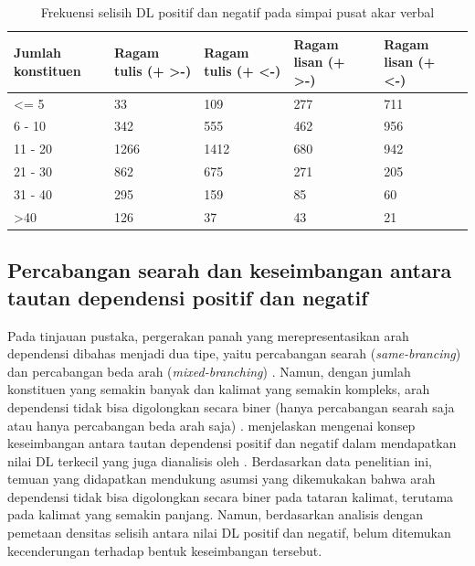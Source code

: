 
\begin{table}
\begin{center}
\begin{small}
\caption{Frekuensi selisih DL positif dan negatif pada simpai pusat akar verbal}  \label{tab:DLpusatposneg}
\begin{tabular}{ | p{2cm} | p{2cm} | p{2cm} | p{2cm} | p{2cm} |}
    \hline
Jumlah konstituen & Ragam tulis (+ \textgreater -) & Ragam tulis (+ \textless -) & Ragam lisan (+ \textgreater -) & Ragam lisan (+ \textless -) \\ \hline
\textless= 5 & 33 & 109 & 277 & 711 \\ \hline
6 - 10 & 342 & 555 & 462 & 956 \\ \hline
11 - 20 & 1266 & 1412 & 680 & 942 \\ \hline
21 - 30 & 862 & 675 & 271 & 205 \\ \hline
31 - 40 & 295 & 159 & 85 & 60 \\ \hline
\textgreater 40 & 126 & 37 & 43 & 21 \\ \hline
   \end{tabular}
   \end{small}
\end{center}
\end{table}


\subsection{Percabangan searah dan keseimbangan antara tautan dependensi positif dan negatif}
Pada tinjauan pustaka, pergerakan panah yang merepresentasikan arah dependensi dibahas menjadi dua tipe, yaitu percabangan searah (\textit{same-brancing}) dan percabangan beda arah (\textit{mixed-branching}) \citep{hawkins1994performance}. Namun, dengan jumlah konstituen yang semakin banyak dan kalimat yang semakin kompleks, arah dependensi tidak bisa digolongkan secara biner (hanya percabangan searah saja atau hanya percabangan beda arah saja) \citealp{dryer1992greenbergian, temperley2008dependency}. \cite{gildea2010grammars} menjelaskan mengenai konsep keseimbangan antara tautan dependensi positif dan negatif dalam mendapatkan nilai DL terkecil yang juga dianalisis oleh \citep{dryer1992greenbergian}. Berdasarkan data penelitian ini, temuan yang didapatkan mendukung asumsi yang dikemukakan \cite{dryer1992greenbergian} bahwa arah dependensi tidak bisa digolongkan secara biner pada tataran kalimat, terutama pada kalimat yang semakin panjang. Namun, berdasarkan analisis dengan pemetaan densitas selisih antara nilai DL positif dan negatif, belum ditemukan kecenderungan terhadap bentuk keseimbangan tersebut. 

